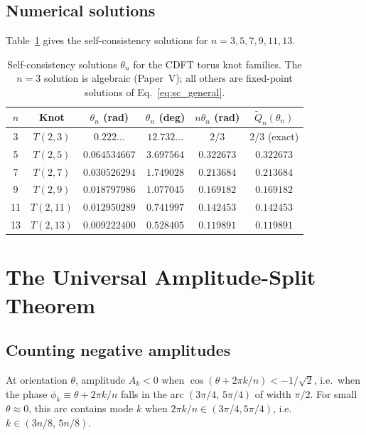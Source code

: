 \documentclass[11pt]{article}
\begin{document}
\subsection{Numerical solutions}

Table~\ref{tab:theta_solutions} gives the self-consistency solutions
for $n = 3, 5, 7, 9, 11, 13$.

\begin{table}[ht]
  \caption{Self-consistency solutions $\theta_n$ for the CDFT torus knot families.
    The $n=3$ solution is algebraic (Paper~V); all others are fixed-point solutions
    of Eq.~\protect\eqref{eq:sc_general}.}
  \label{tab:theta_solutions}
  \begin{tabular}{cccccc}
    \toprule
    $n$ & Knot & $\theta_n$ (rad) & $\theta_n$ (deg) & $n\theta_n$ (rad)
        & $\widetilde{Q}_n(\theta_n)$ \\
    \midrule
    3  & $T(2,3)$ & $0.222\ldots$ & $12.732\ldots$ & $2/3$ & $2/3$ (exact) \\
    5  & $T(2,5)$ & $0.064534667$ & $3.697564$ & $0.322673$ & $0.322673$ \\
    7  & $T(2,7)$ & $0.030526294$ & $1.749028$ & $0.213684$ & $0.213684$ \\
    9  & $T(2,9)$ & $0.018797986$ & $1.077045$ & $0.169182$ & $0.169182$ \\
    11 & $T(2,11)$& $0.012950289$ & $0.741997$ & $0.142453$ & $0.142453$ \\
    13 & $T(2,13)$& $0.009222400$ & $0.528405$ & $0.119891$ & $0.119891$ \\
    \bottomrule
  \end{tabular}
\end{table}


\section{The Universal Amplitude-Split Theorem}
\label{sec:split_theorem}

\subsection{Counting negative amplitudes}

At orientation $\theta$, amplitude $A_k < 0$ when
$\cos(\theta + 2\pi k/n) < -1/\sqrt{2}$, i.e.\ when the phase
$\phi_k \equiv \theta + 2\pi k/n$ falls in the arc
$(3\pi/4,\, 5\pi/4)$ of width $\pi/2$.
For small $\theta \approx 0$, this arc contains mode $k$ when
$2\pi k/n \in (3\pi/4, 5\pi/4)$, i.e.\ $k \in (3n/8,\, 5n/8)$.
\end{document}
